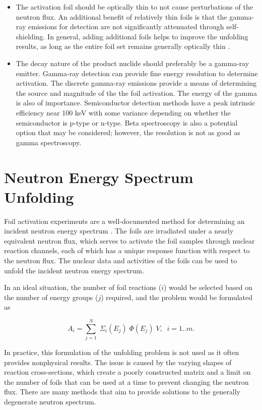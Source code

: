 \begin{itemize}
    \item The activation foil should be optically thin to not cause 
    perturbations of the neutron flux.
    An additional benefit of relatively thin foils is that the gamma-ray emissions for detection are not significantly attenuated through self-shielding. 
    In general, adding additional foils helps to improve the unfolding 
    results, as long as the entire foil set remains generally optically thin \cite{Vagena2018b}. 

    \item The decay nature of the product nuclide should preferably be a gamma-ray emitter. 
    Gamma-ray detection can provide fine energy resolution to 
    determine activation. 
    The discrete gamma-ray emissions provide a means of determining the source and magnitude of the the foil activation. 
    The energy of the gamma is also of importance. 
    Semiconductor detection methods have a peak intrinsic efficiency near 100 keV with some variance depending on whether the semiconductor is p-type or n-type. 
    Beta spectroscopy is also a potential option that may be considered; however, the resolution is not as good as gamma spectroscopy.  
\end{itemize}

\section{Neutron Energy Spectrum Unfolding}

Foil activation experiments are a well-documented method for determining an incident neutron energy spectrum \cite{Knoll}. 
The foils are irradiated under a nearly equivalent neutron flux, which serves to activate the foil samples through nuclear reaction channels, each of which has a unique response 
function with respect to the neutron flux. 
The nuclear data and activities of the foils can be used to unfold the incident neutron energy spectrum.

In an ideal situation, the number of foil reactions ($i$) would be selected based on the number of energy groups ($j$) required, and the problem would be formulated as \cite{Vagena2018b, Luciano2012a}  

\begin{equation} \label{eq:BadWaytoGetFlux}
    A_{i}= \sum_{j=1}^{N} \; \Sigma_{i}(E_{j}) \;\Phi(E_{j}) \;V,\;\; 
    i=1..m.
\end{equation}

\noindent In practice, this formulation of the unfolding problem is not used as it often provides nonphysical results.
The issue is caused by the varying shapes of reaction cross-sections, which create a poorly constructed matrix and a limit on the number of foils that can be used at a time to prevent changing the neutron flux. 
There are many methods that aim to provide solutions to the generally degenerate neutron spectrum. 


